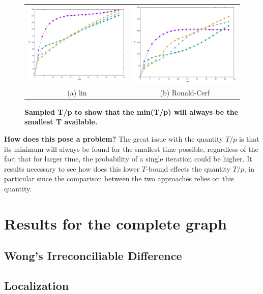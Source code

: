 \begin{figure}[!ht]
\centering
\begin{tabular}{cc}
  \includegraphics[width=75mm]{./figures/sampled_t_over_p/T_p_lin.pdf} &   \includegraphics[width=75mm]{./figures/sampled_t_over_p/T_p_cerf.pdf} \\
(a) lin & (b) Ronald-Cerf\\[6pt]
\end{tabular}
\caption[Sampled T/p ]{\textbf{Sampled T/p to show that the min(T/p) will always be the smallest T available.}}
\end{figure}

\textbf{How does this pose a problem?} The great issue with the quantity $T/p$ is that its minimum will always be found for the smallest time possible, regardless of the fact that for larger time, the probability of a single iteration could be higher. It results necessary to see how does this lower $T$-bound effects the quantity $T/p$, in particular since the comparison between the two approaches relies on this quantity.

\section{Results for the complete graph}
\subsection{Wong's Irreconciliable Difference }
\subsection{Localization}